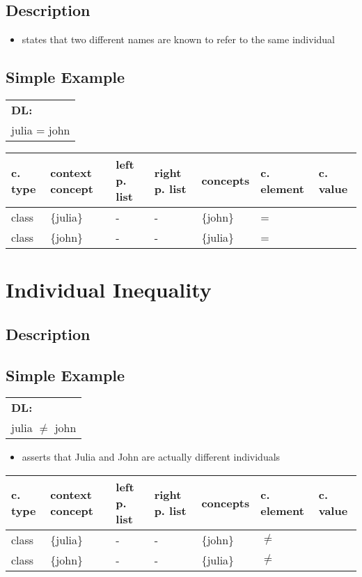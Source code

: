 \documentclass{llncs}
\newenvironment{gcotable}{
  \scriptsize
  \sffamily
  \vspace{0.3cm}
  \begin{tabular}{l|l|l|l|l|l|l}
  \hline
  \textbf{c. type} & \textbf{context concept} & \textbf{left p. list} & \textbf{right p. list} & \textbf{concepts} & \textbf{c. element} & \textbf{c. value} \\
  \hline

}{
  \hline
  \end{tabular}
  \linebreak
}
\newenvironment{DL}{
  \scriptsize
  \sffamily
  \vspace{0.3cm}
  \begin{tabular}{l}
	\textbf{DL:} \\

}{
  \end{tabular}
  \linebreak
}
\begin{document}
\subsection{Description}

\begin{itemize}
	\item states that two different names are known to refer to the same individual \cite{Kroetzsch2012}
\end{itemize}

\subsection{Simple Example}

\begin{DL}
julia = john \\
\end{DL}

\begin{gcotable}
class & \{julia\} & - & - & \{john\} & = \\
class & \{john\} & - & - & \{julia\} & = \\
\end{gcotable}

\section{Individual Inequality}

\subsection{Description}

\subsection{Simple Example}

\begin{DL}
julia $\ne$ john
\end{DL}

\begin{itemize}
	\item asserts that Julia and John are actually different individuals
\end{itemize}

\begin{gcotable}
class & \{julia\} & - & - & \{john\} & $\ne$ \\
class & \{john\} & - & - & \{julia\} & $\ne$ \\
\end{gcotable}
\end{document}
